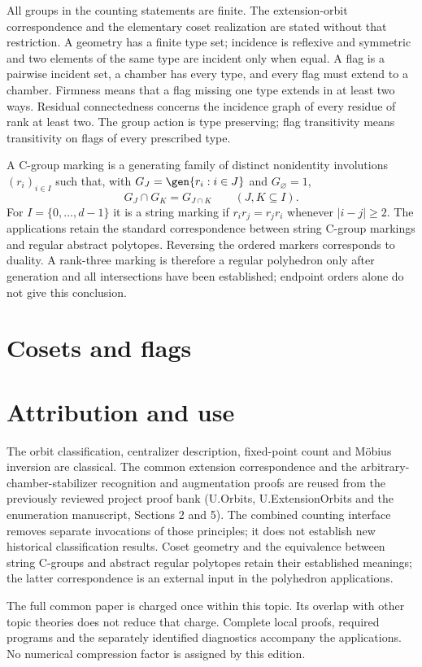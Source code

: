 All groups in the counting statements are finite. The extension-orbit
correspondence and the elementary coset realization are stated without that
restriction. A geometry has a finite type set; incidence is reflexive and
symmetric and two elements of the same type are incident only when equal.
A flag is a pairwise incident set, a chamber has every type, and every flag
must extend to a chamber. Firmness means that a flag missing one type extends
in at least two ways. Residual connectedness concerns the incidence graph of
every residue of rank at least two. The group action is type preserving;
flag transitivity means transitivity on flags of every prescribed type.

A C-group marking is a generating family of distinct nonidentity
involutions $(r_i)_{i\in I}$ such that, with
$G_J=\gen{r_i:i\in J}$ and $G_\varnothing=1$,
\[
 G_J\cap G_K=G_{J\cap K}\qquad(J,K\subseteq I).
\]
For $I=\{0,\ldots,d-1\}$ it is a string marking if
$r_i r_j=r_j r_i$ whenever $|i-j|\ge2$.
The applications retain the standard correspondence between string
C-group markings and regular abstract polytopes. Reversing the ordered
markers corresponds to duality. A rank-three marking is therefore a
regular polyhedron only after generation and all intersections have been
established; endpoint orders alone do not give this conclusion.



\section{Cosets and flags}


\section*{Attribution and use}
The orbit classification, centralizer description, fixed-point count and
M\"obius inversion are classical. The common extension correspondence and
the arbitrary-chamber-stabilizer recognition and augmentation proofs are
reused from the previously reviewed project proof bank (U.Orbits,
U.ExtensionOrbits and the enumeration manuscript, Sections 2 and 5).
The combined counting interface removes separate invocations of those
principles; it does not establish new historical classification results.
Coset geometry and the equivalence between string C-groups and abstract
regular polytopes retain their established meanings; the latter correspondence
is an external input in the polyhedron applications.

The full common paper is charged once within this topic. Its overlap with
other topic theories does not reduce that charge. Complete local proofs,
required programs and the separately identified diagnostics accompany the
applications. No numerical compression factor is assigned by this edition.

